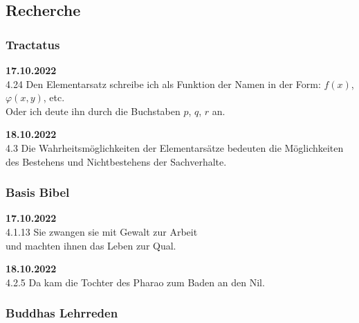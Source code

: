 \documentclass[10pt,a4paper]{article}
\begin{document}
\printbibliography[keyword=Theater, heading=subbibliography,
  title={Theatestücke}]


\printbibliography[keyword=Bilder, heading=subbibliography,
  title={Bilderbücher}]


\printbibliography[keyword=Kindergeschichten, heading=subbibliography,
  title={Kindergeschichten}]


\printbibliography[keyword=Vorschule, heading=subbibliography,
  title={Vorschule}]


\printbibliography[keyword=Schule, heading=subbibliography,
  title={Schulbücher}]


\printbibliography[keyword=Evolution, heading=subbibliography,
  title={Evolution}]


\newpage
\subsection{Recherche}

\subsubsection{Tractatus}

{\bf 17.10.2022} \\
4.24 Den Elementarsatz schreibe ich als Funktion der Namen in der Form:
$f(x)$, $\varphi (x,y)$, etc. \\
Oder ich deute ihn durch die Buchstaben $p$, $q$, $r$ an.

\vskip 4pt
{\bf 18.10.2022} \\
4.3 Die Wahrheitsmöglichkeiten der Elementarsätze bedeuten die Möglichkeiten des
Bestehens und Nichtbestehens der Sachverhalte.


\subsubsection{Basis Bibel}

{\bf 17.10.2022} \\
4.1.13 Sie zwangen sie mit Gewalt zur Arbeit \\
und machten ihnen das Leben zur Qual.

\vskip 4pt
{\bf 18.10.2022} \\
4.2.5 Da kam die Tochter des Pharao zum Baden an den Nil.


\subsubsection{Buddhas Lehrreden}
\end{document}
